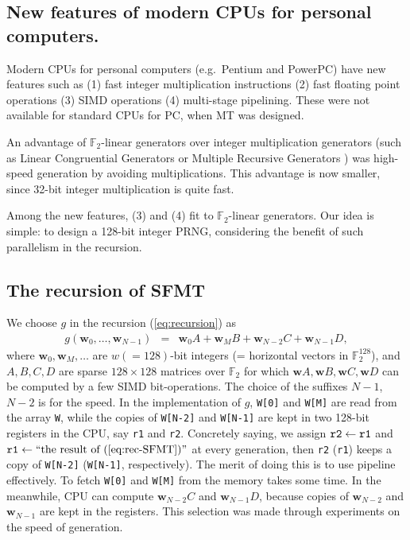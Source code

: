 \documentclass[acmnow]{acmtrans2m}
\def\F2{{\mathbb F}_2}
\def\bw{{{\mathbf w}}}
\begin{document}
\subsection{New features of modern CPUs for personal computers.}
Modern CPUs for personal computers (e.g.\ Pentium and
PowerPC) have new features such as 
(1) fast integer multiplication instructions
(2) fast floating point operations 
(3) SIMD operations 
(4) multi-stage pipelining.
These were not available 
for standard CPUs for PC, when MT was designed.

An advantage of $\F2$-linear generators 
over integer multiplication generators 
(such as Linear Congruential Generators \cite{knuth:bible}
or Multiple Recursive Generators \cite{MRG})
was high-speed generation by avoiding multiplications.
This advantage is now smaller, since 
32-bit integer multiplication is quite fast. 

Among the new features,
(3) and (4) fit to $\F2$-linear generators. 
Our idea is simple: to design
a 128-bit integer PRNG, considering
the benefit of such parallelism in the recursion.

\subsection{The recursion of SFMT}
We choose $g$ in the recursion (\ref{eq:recursion}) as
\begin{eqnarray}\label{eq:rec-SFMT}
g(\bw_0,\ldots,\bw_{N-1}) 
&=& \bw_0A + \bw_MB + \bw_{N-2}C + \bw_{N-1}D,
\end{eqnarray}
where 
$\bw_0, \bw_M, \ldots$ are $w(=128)$-bit integers 
(= horizontal vectors in $\F2^{128}$),
and $A, B, C, D$ are sparse $128 \times 128$ matrices
over $\F2$ for which 
$\bw A, \bw B, \bw C, \bw D$ can be computed by
a few SIMD bit-operations.
The choice of the suffixes $N-1$, $N-2$ is for the 
speed. In the implementation of $g$, 
{\tt W[0]} and {\tt W[M]} are read from the array
{\tt W}, while the copies of 
{\tt W[N-2]} and {\tt W[N-1]}
are kept in 
two 128-bit registers in the CPU, 
say {\tt r1} and {\tt r2}. Concretely saying, we assign 
${\tt r2} \leftarrow {\tt r1}$ and
${\tt r1} \leftarrow \mbox{``the result of (\ref{eq:rec-SFMT})''}$
at every generation, then {\tt r2} ({\tt r1}) keeps
a copy of {\tt W[N-2]} ({\tt W[N-1]}, respectively). 
The merit of doing this is to use pipeline effectively. To fetch 
{\tt W[0]} and {\tt W[M]} from the memory takes some
time. In the meanwhile, 
CPU can compute $\bw_{N-2}C$ and $\bw_{N-1}D$,
because copies of $\bw_{N-2}$ and $\bw_{N-1}$ are kept 
in the registers. This selection was made through experiments
on the speed of generation.
\end{document}

